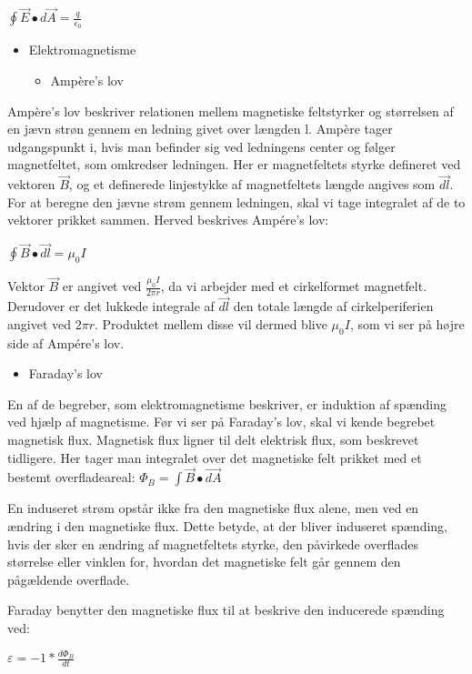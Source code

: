 \centerline{$\oint \vec{E} \bullet d \vec{A} = \frac{q}{\epsilon_0}$}

\begin{itemize}
\item Elektromagnetisme
\begin{itemize}
\item Ampère's lov
\end{itemize}
\end{itemize}
Ampère's lov beskriver relationen mellem magnetiske feltstyrker og størrelsen af en jævn strøn gennem en ledning givet over længden l. Ampère tager udgangspunkt i, hvis man befinder sig ved ledningens center og følger magnetfeltet, som omkredser ledningen. Her er magnetfeltets styrke defineret ved vektoren $\vec{B}$, og et definerede linjestykke af magnetfeltets længde angives som $\vec{dl}$. For at beregne den jævne strøm gennem ledningen, skal vi tage integralet af de to vektorer prikket sammen. Herved beskrives Ampére's lov:

\centerline{$\oint \vec{B} \bullet \vec{dl} = \mu_0 I$}

Vektor $\vec{B}$ er angivet ved $\frac{\mu_0 I}{2 \pi r}$, da vi arbejder med et cirkelformet magnetfelt. Derudover er det lukkede integrale af $\vec{dl}$ den totale længde af cirkelperiferien angivet ved $2 \pi r$. Produktet mellem disse vil dermed blive $\mu_0 I$, som vi ser på højre side af Ampére's lov.


\begin{itemize}
\item Faraday's lov
\end{itemize}
En af de begreber, som elektromagnetisme beskriver, er induktion af spænding ved hjælp af magnetisme. Før vi ser på Faraday's lov, skal vi kende begrebet magnetisk flux. Magnetisk flux ligner til delt elektrisk flux, som beskrevet tidligere. Her tager man integralet over det magnetiske felt prikket med et bestemt overfladeareal: $\Phi_B = \int \vec{B} \bullet \vec{dA}$

En induseret strøm opstår ikke fra den magnetiske flux alene, men ved en ændring i den magnetiske flux. Dette betyde, at der bliver induseret spænding, hvis der sker en ændring af magnetfeltets styrke, den påvirkede overflades størrelse eller vinklen for, hvordan det magnetiske felt går gennem den pågældende overflade.

Faraday benytter den magnetiske flux til at beskrive den inducerede spænding ved:

\centerline{$\varepsilon = -1 * \frac{d \Phi_B}{dt}$}

